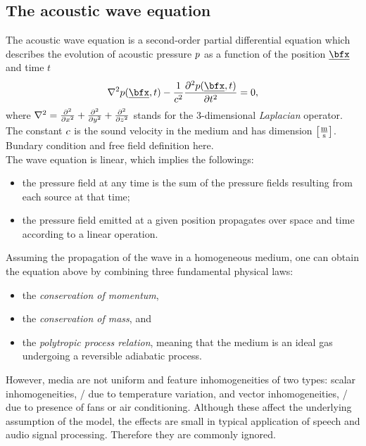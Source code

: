 \subsection{The acoustic wave equation}\label{subsec:acoustics:waveq}
The acoustic wave equation is a second-order partial differential equation which describes the evolution of acoustic pressure $\pressure$
as a function of the position $\positionMicrophone$ and time $t$
\begin{equation}
    \label{eq:acoustics:wave}
    \knabla^2 \pressureSpaceTime - \frac{1}{\speedOfSound^2} \kpderiv[2]{\pressureSpaceTime}{t} = 0
    ,
\end{equation}
where $\knabla^2 = \kpderiv[2]{}{x} + \kpderiv[2]{}{y} + \kpderiv[2]{}{z}$ stands for the 3-dimensional \textit{Laplacian} operator.
The constant $\speedOfSound$ is the sound velocity in the medium and has dimension $\kbracket{\frac{\si{\metre}}{\si{\second}}}$.
\\Bundary condition and free field definition here.
\\The wave equation is linear, which implies the followings:
\begin{itemize}
    \item the pressure field at any time is the sum of the pressure fields resulting from each source at that time;
    \item the pressure field emitted at a given position propagates over space and time according to a linear operation.
\end{itemize}

\mynewline
Assuming the propagation of the wave in a homogeneous medium, one can obtain the equation above by combining three fundamental physical laws:
\begin{itemize}
    \item the \textit{conservation of momentum},
    \item the \textit{conservation of mass}, and
    \item the \textit{polytropic process relation}, meaning that the medium is an ideal gas undergoing a reversible adiabatic process.
\end{itemize}
However, media are not uniform and feature inhomogeneities of two types:
scalar inhomogeneities, \eg/ due to temperature variation,
and vector inhomogeneities, \eg/ due to presence of fans or air conditioning.
Although these affect the underlying assumption of the model, the effects are small in typical application of speech and audio signal processing.
Therefore they are commonly ignored.

